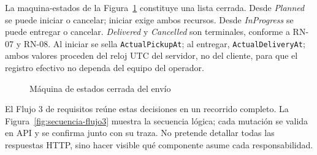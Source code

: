 La \gls{maquina-estados} de la Figura~\ref{fig:maquina-estados-s4} constituye una lista cerrada. Desde \emph{Planned} se puede iniciar o cancelar; iniciar exige ambos recursos. Desde \emph{InProgress} se puede entregar o cancelar. \emph{Delivered} y \emph{Cancelled} son terminales, conforme a RN-07 y RN-08. Al iniciar se sella \texttt{ActualPickupAt}; al entregar, \texttt{ActualDeliveryAt}; ambos valores proceden del reloj UTC del servidor, no del cliente, para que el registro efectivo no dependa del equipo del operador.

\begin{figure}[htbp]
\centering
{}
\caption{Máquina de estados cerrada del envío}
\label{fig:maquina-estados-s4}
\end{figure}

El Flujo 3 de requisitos reúne estas decisiones en un recorrido completo. La Figura~\ref{fig:secuencia-flujo3} muestra la secuencia lógica; cada mutación se valida en API y se confirma junto con su traza. No pretende detallar todas las respuestas HTTP, sino hacer visible qué componente asume cada responsabilidad.

